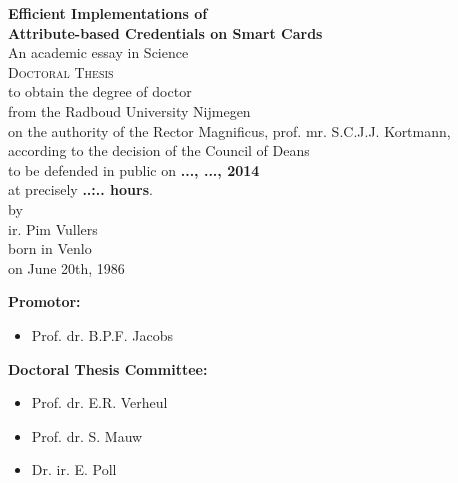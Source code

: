 \begin{center}
  \thispagestyle{empty}

  \textbf{\Large Efficient Implementations of\\ Attribute-based Credentials on Smart Cards}\\[15mm]

  An academic essay in Science \\[15mm]

  \textsc{Doctoral Thesis} \\[15mm]

  to obtain the degree of doctor \\
  from the Radboud University Nijmegen \\
  on the authority of the Rector Magnificus, prof. mr. S.C.J.J. Kortmann, \\
  according to the decision of the Council of Deans \\
  to be defended in public on \textbf{..., ..., 2014} \\
  at precisely \textbf{..:.. hours}. \\[30mm]

  by \\[30mm]

  ir. Pim Vullers \\[15mm]

  born in Venlo \\
  on June 20th, 1986
\end{center}

\clearpage

\thispagestyle{empty}

\textbf{Promotor:}
\begin{itemize}
  \item[~] Prof. dr. B.P.F. Jacobs
\end{itemize}

\textbf{Doctoral Thesis Committee:}
\begin{itemize}
  \item[~] Prof. dr. E.R. Verheul
  \item[~] Prof. dr. S. Mauw
  \item[~] Dr. ir. E. Poll
\end{itemize}